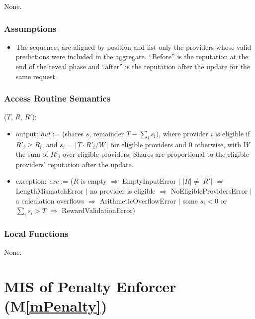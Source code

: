 \documentclass[12pt, titlepage]{article}
\newcommand{\mref}[1]{M\ref{#1}}
\let\unbreakabletexttt\texttt
\renewcommand{\texttt}[1]{\unbreakabletexttt{\seqsplit{#1}}}
\begin{document}
None.

\subsubsection{Assumptions}

\begin{itemize}
\item The sequences are aligned by position and list only the providers whose
  valid predictions were included in the aggregate. ``Before'' is the
  reputation at the end of the reveal phase and ``after'' is the reputation after
  the update for the same request.
\end{itemize}

\subsubsection{Access Routine Semantics}

\noindent \texttt{calculateRewards}($T$, $R$, $R'$):
\begin{itemize}
\item output: \textit{out} := (shares $s$, remainder $T - \sum_i s_i$), where
  provider $i$ is eligible if $R'_i \ge R_i$, and $s_i = \lfloor T \cdot R'_i /
  W \rfloor$ for eligible providers and 0 otherwise, with $W$ the sum of $R'_j$
  over eligible providers. Shares are proportional to the eligible providers'
  reputation after the update.
\item exception: \textit{exc} := ($R$ is empty $\Rightarrow$ EmptyInputError
  $\mid$ $|R| \neq |R'|$ $\Rightarrow$ LengthMismatchError $\mid$ no provider is
  eligible $\Rightarrow$ NoEligibleProvidersError $\mid$ a calculation
  overflows $\Rightarrow$ ArithmeticOverflowError $\mid$ some $s_i < 0$ or
  $\sum_i s_i > T$ $\Rightarrow$ RewardValidationError)
\end{itemize}

\subsubsection{Local Functions}

None.


\newpage

\section{MIS of Penalty Enforcer (\mref{mPenalty})} \label{misPenalty}
\end{document}
